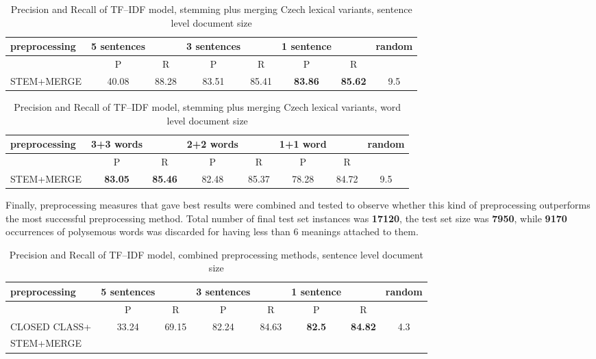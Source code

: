 \begin{table}[h!]
\begin{tabular}{ l | c c | c c | c c | c}
   preprocessing &  5 sentences && 3 sentences && 1 sentence  && random\\
\hline
	& P  &  R & P  &  R & P  &  R &\\
\hline\hline
STEM+MERGE & 40.08  & 88.28  & 83.51  & 85.41  & \textbf{83.86}  &  \textbf{85.62} & 9.5  \\
\end{tabular}
\caption{Precision and Recall of TF--IDF model, stemming plus merging Czech lexical variants, sentence level document size}
\end{table}

\begin{table}[h!]
\begin{tabular}{ l | c c | c c | c c | c}
   preprocessing &  3+3 words && 2+2 words && 1+1 word  && random\\
\hline\hline
	& P  &  R & P  &  R & P  &  R &\\
\hline
STEM+MERGE & \textbf{ 83.05}  & \textbf{85.46}  & 82.48 &  85.37 & 78.28  &  84.72 & 9.5\\
\end{tabular}
\caption{Precision and Recall of TF--IDF model, stemming plus merging Czech lexical variants, word level document size}
\end{table}

Finally, preprocessing measures that gave best results were combined and tested to observe whether
this kind of preprocessing outperforms the most successful preprocessing method. Total number of final test set instances was  \textbf{17120}, the test set size was \textbf{7950}, while \textbf{9170} occurrences of polysemous words was discarded for having less than 6 meanings attached to them.

\begin{table}[h!]
\begin{tabular}{ l | c c | c c | c c | c}
   preprocessing &  5 sentences && 3 sentences && 1 sentence  && random\\
\hline
	& P  &  R & P  &  R & P  &  R &\\
\hline\hline
CLOSED CLASS+ & 33.24  & 69.15  & 82.24  & 84.63 & \textbf{82.5} & \textbf{84.82} & 4.3  \\
STEM+MERGE &&&&&&&\\
\end{tabular}
\caption{Precision and Recall of TF--IDF model, combined preprocessing methods, sentence level document size}
\end{table}

